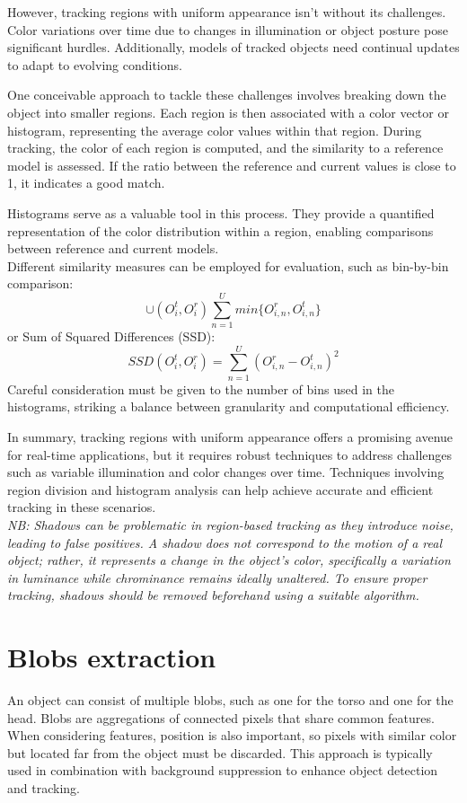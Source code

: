 However, tracking regions with uniform appearance isn't without its challenges. 
Color variations over time due to changes in illumination or object posture pose significant hurdles. 
Additionally, models of tracked objects need continual updates to adapt to evolving conditions.

One conceivable approach to tackle these challenges involves breaking down the object into smaller regions. 
Each region is then associated with a color vector or histogram, representing the average color values within that region. 
During tracking, the color of each region is computed, and the similarity to a reference model is assessed. 
If the ratio between the reference and current values is close to 1, it indicates a good match.

Histograms serve as a valuable tool in this process. 
They provide a quantified representation of the color distribution within a region, enabling comparisons between reference and current models. 
\\Different similarity measures can be employed for evaluation, such as bin-by-bin comparison: \[\cup (O_i^t, O_i^r) \sum_{n=1}^{U} min \{O_{i,n}^r, O_{i,n}^t\} \]
or Sum of Squared Differences (SSD): \[SSD(O_i^t, O_i^r) = \sum_{n=1}^{U} (O_{i,n}^r - O_{i,n}^t)^2 \]
Careful consideration must be given to the number of bins used in the histograms, striking a balance between granularity and computational efficiency.

In summary, tracking regions with uniform appearance offers a promising avenue for real-time applications, but it requires robust techniques to address challenges such as variable illumination and color changes over time. 
Techniques involving region division and histogram analysis can help achieve accurate and efficient tracking in these scenarios.
\\\textit{NB: Shadows can be problematic in region-based tracking as they introduce noise, leading to false positives. 
A shadow does not correspond to the motion of a real object; rather, it represents a change in the object's color, specifically a variation in luminance while chrominance remains ideally unaltered. 
To ensure proper tracking, shadows should be removed beforehand using a suitable algorithm.}
\section{Blobs extraction} 
An object can consist of multiple blobs, such as one for the torso and one for the head. Blobs are aggregations of connected pixels that share common features. 
When considering features, position is also important, so pixels with similar color but located far from the object must be discarded. 
This approach is typically used in combination with background suppression to enhance object detection and tracking.
